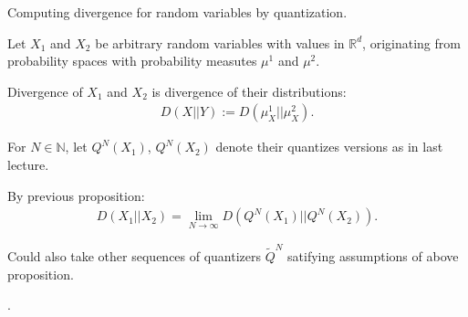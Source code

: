 \begin{frame}{Computing divergence for random variables by quantization.} 
\bit
\item Let $X_1$ and $X_2$ be arbitrary random variables with values in $\mathbb{R}^d$, originating from probability
 spaces with probability measutes $\mu^1$ and $\mu^2$. 
\item Divergence of $X_1$ and $X_2$ is divergence of their distributions:
\begin{align*}
D(X||Y):=D(\mu^1_{X}||\mu^2_{X}). 
\end{align*}
\item For $N\in\mathbb{N}$, let $Q^N(X_1)$, $Q^N(X_2)$ denote their quantizes versions as in last lecture. 
\item By previous proposition:
\begin{align}\label{DivRV}
D(X_1||X_2)=\lim_{N\to\infty} D(Q^N(X_1)||Q^N(X_2)). 
\end{align}
\item Could also take other sequences of quantizers $\tilde{Q}^N$ satifying assumptions of above proposition. 
\item[] .  
\eit



%
\end{frame}


